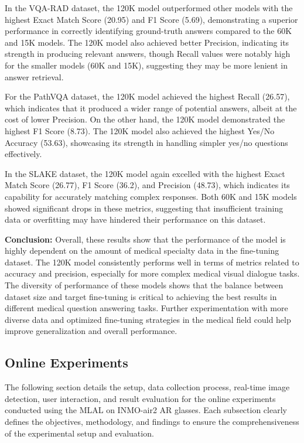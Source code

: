 \documentclass[10pt,letterpaper]{article}
\begin{document}
In the VQA-RAD dataset, the 120K model outperformed other models with the highest Exact Match Score (20.95) and F1 Score (5.69), demonstrating a superior performance in correctly identifying ground-truth answers compared to the 60K and 15K models. The 120K model also achieved better Precision, indicating its strength in producing relevant answers, though Recall values were notably high for the smaller models (60K and 15K), suggesting they may be more lenient in answer retrieval.

For the PathVQA dataset, the 120K model achieved the highest Recall (26.57), which indicates that it produced a wider range of potential answers, albeit at the cost of lower Precision. On the other hand, the 120K model demonstrated the highest F1 Score (8.73). The 120K model also achieved the highest Yes/No Accuracy (53.63), showcasing its strength in handling simpler yes/no questions effectively.

In the SLAKE dataset, the 120K model again excelled with the highest Exact Match Score (26.77), F1 Score (36.2), and Precision (48.73), which indicates its capability for accurately matching complex responses. Both 60K and 15K models showed significant drops in these metrics, suggesting that insufficient training data or overfitting may have hindered their performance on this dataset.

\textbf{Conclusion:} Overall, these results show that the performance of the model is highly dependent on the amount of medical specialty data in the fine-tuning dataset. The 120K model consistently performs well in terms of metrics related to accuracy and precision, especially for more complex medical visual dialogue tasks. The diversity of performance of these models shows that the balance between dataset size and target fine-tuning is critical to achieving the best results in different medical question answering tasks. Further experimentation with more diverse data and optimized fine-tuning strategies in the medical field could help improve generalization and overall performance.


\subsection*{Online Experiments}

The following section details the setup, data collection process, real-time image detection, user interaction, and result evaluation for the online experiments conducted using the MLAL on INMO-air2 AR glasses. Each subsection clearly defines the objectives, methodology, and findings to ensure the comprehensiveness of the experimental setup and evaluation.
\end{document}
